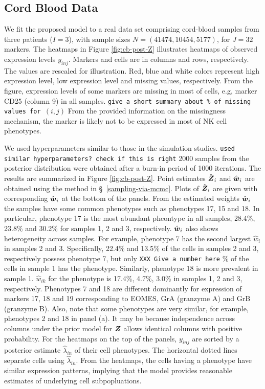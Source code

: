\documentclass[12pt,]{article}
\newcommand{\bZ}{\mbox{\boldmath $Z$}}
\newcommand{\bw}{\mbox{\boldmath $w$}}
\begin{document}
\subsection{Cord Blood Data}
We fit the proposed model to a real data set comprising
cord-blood samples from three patients ($I=3$), with sample sizes $N=(41474,
10454, 5177)$, for $J=32$ markers. The heatmaps in Figure \ref{fig:cb-post-Z} illustrates heatmaps of observed expression levels $y_{inj}$.  Markers and cells are in columns and rows, respectively. The values are rescaled for illustration.  Red, blue and white colors represent high expression level, low expression level and missing values, respectively.  From the figure, expression levels of some markers are missing in most of cells, e.g, marker CD25 (column 9) in all samples.
%
{\tt give a short summary about \% of missing values for $(i,j)$}
%
From the provided information on the missingness mechanism, the marker is likely not to be expressed in most of NK cell phenotypes.   


We used hyperparameters similar to those in the simulation studies.
%
{\tt used similar hyperparameters?  check if this is right}
%
2000 samples from the posterior distribution were obtained after a burn-in period of 1000 iterations. The results are summarized in Figure
\ref{fig:cb-post-Z}.  Point estimates $\hat{\bZ}_i$ and $\hat{\bw}_i$ are obtained using the method in \S~\ref{sampling-via-mcmc}. %
Plots of $\hat{\bZ}_i$ are given with corresponding $\hat{\bw}_i$ at the bottom
of the panels.  From the estimated weights $\hat{\bw}_i$ the samples have some
common phenotypes such as phenotypes 17, 15 and 18.  In particular, phenotype
17 is the most abundant pheontype in all samples, 28.4\%, 23.8\% and 30.2\% for
samples 1, 2 and 3, respectively.  $\hat{\bw}_i$ also shows heterogeneity
across samples.  For example, phenotype 7 has the second largest $\hat{w}_i$ in
samples 2 and 3. Specifically, 22.4\% and 13.5\% of the cells in samples 2 and
3, respectively possess phenotype 7, but only {\tt XXX  Give a number here} \%
of the cells in sample 1 has the phenotype.  Similarly, phenotype 18 is more
prevalent in sample 1.  $\hat{w}_{ik}$ for the phenotype is 17.4\%, 4.7\%,
3.0\% in samples 1, 2 and 3, respectively.  Phenotypes 7 and 18 are different
dominantly for expression of markers 17, 18 and 19 corresponding to EOMES, GrA
(granzyme A) and GrB (granzyme B).  Also, note that some phenotypes are very
similar, for example, phenotypes 2 and 18 in panel (a).  It may be because
independence across columns under the prior model for $\bZ$ allows identical
columns with positive probability.  For the heatmaps on the top of the panels,
$y_{inj}$ are sorted by a posterior estimate $\hat{\lambda}_{in}$ of their cell
phenotypes. The horizontal dotted lines separate cells using
$\hat{\lambda}_{in}$.  From the heatmaps, the cells having a phenotype have
similar expression patterns, implying that the model provides reasonable
estimates of underlying cell subpopluations.
\end{document}
